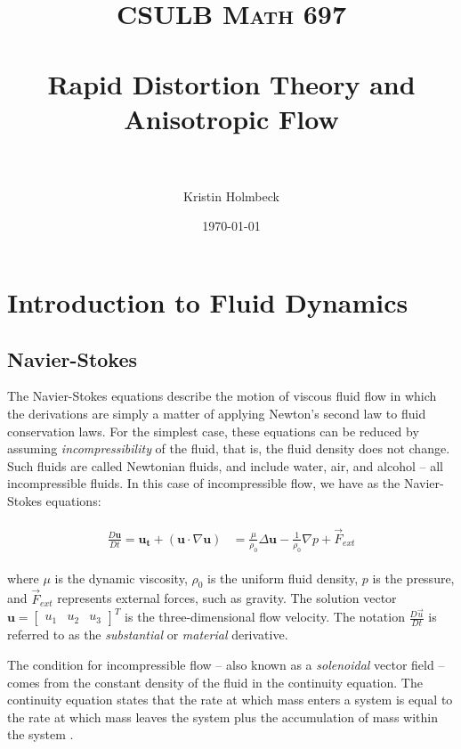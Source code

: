 \documentclass[paper=a4, fontsize=11pt]{scrartcl} %
\title{ 
\normalfont \normalsize 
\textsc{CSULB Math 697} \\ [25pt] %
\horrule{0.5pt} \\[0.4cm] %
\huge Rapid Distortion Theory and Anisotropic Flow \\ %
\horrule{2pt} \\[0.5cm] %
}
\author{Kristin Holmbeck} %
\date{\normalsize\today} %
\numberwithin{equation}{section} %
\numberwithin{figure}{section} %
\numberwithin{table}{section} %
\begin{document}
\maketitle %
\tableofcontents
\pagebreak


\section{Introduction to Fluid Dynamics}

\subsection{Navier-Stokes}

The Navier-Stokes equations describe the motion of viscous fluid flow in which the derivations are simply a matter of applying Newton's second law to fluid conservation laws. For the simplest case, these equations can be reduced by assuming \textit{incompressibility} of the fluid, that is, the fluid density does not change. Such fluids are called Newtonian fluids, and include water, air, and alcohol -- all incompressible fluids. 
In this case of incompressible flow, we have as the Navier-Stokes equations:

\begin{align} 
\begin{split}
    \frac{D \bm{u}}{Dt} = 
    \bm{u_t} + \left( \bm{u} \cdot \nabla \bm{u} \right) &=
         \frac{\mu}{\rho_0} \Delta \bm{u} - \frac{1}{\rho_0} \nabla p + \Vec{F}_{ext}
\end{split}             
\end{align}

where $\mu$ is the dynamic viscosity, $\rho_0$ is the uniform fluid density, $p$ is the pressure,
and $\Vec{F}_{ext}$ represents external forces, such as gravity. The solution vector 
$\bm{u} = \begin{bmatrix} u_1 & u_2 & u_3 \end{bmatrix}^T$ is the three-dimensional flow velocity. 
The notation $\frac{D \Vec{u}}{Dt}$ is referred to as the \textit{substantial} or \textit{material} derivative.

\par

The condition for incompressible flow -- also known as a \textit{solenoidal} vector field -- comes from the constant density of the fluid in the continuity equation. The continuity equation states that the rate at which mass enters a system is equal to the rate at which mass leaves the system plus the accumulation of mass within the system \cite{pedlosky}. 
\end{document}
